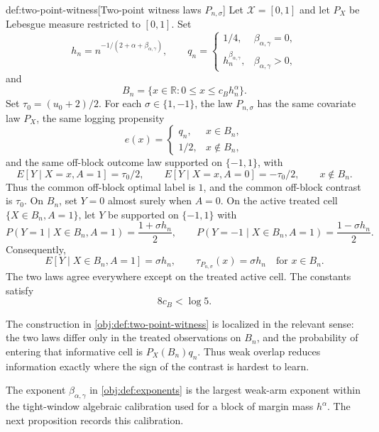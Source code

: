 \begin{definitionv}{def:two-point-witness}[Two-point witness laws \(P_{n,\sigma}\)]
Let \(\mathcal X=[0,1]\) and let \(P_X\) be Lebesgue measure restricted to \([0,1]\). Set
\[
h_n=n^{-1/(2+\alpha+\beta_{\alpha,\gamma})},
\qquad
q_n=
\begin{cases}
1/4, & \beta_{\alpha,\gamma}=0,\\
h_n^{\beta_{\alpha,\gamma}}, & \beta_{\alpha,\gamma}>0,
\end{cases}
\]
and
\[
B_n=\{x\in\mathbb R:0\le x\le c_Bh_n^\alpha\}.
\]
Set \(\tau_0=(u_0+2)/2\). For each \(\sigma\in\{1,-1\}\), the law \(P_{n,\sigma}\) has the same covariate law \(P_X\), the same logging propensity
\[
e(x)=
\begin{cases}
q_n, & x\in B_n,\\
1/2, & x\notin B_n,
\end{cases}
\]
and the same off-block outcome law supported on \(\{-1,1\}\), with
\[
E[Y\mid X=x,A=1]=\tau_0/2,
\qquad
E[Y\mid X=x,A=0]=-\tau_0/2,
\qquad x\notin B_n .
\]
Thus the common off-block optimal label is \(1\), and the common off-block contrast is \(\tau_0\). On \(B_n\), set \(Y=0\) almost surely when \(A=0\). On the active treated cell \(\{X\in B_n,A=1\}\), let \(Y\) be supported on \(\{-1,1\}\) with
\[
P(Y=1\mid X\in B_n,A=1)=\frac{1+\sigma h_n}{2},
\qquad
P(Y=-1\mid X\in B_n,A=1)=\frac{1-\sigma h_n}{2}.
\]
Consequently,
\[
E[Y\mid X\in B_n,A=1]=\sigma h_n,
\qquad
\tau_{P_{n,\sigma}}(x)=\sigma h_n
\quad\text{for }x\in B_n .
\]
The two laws agree everywhere except on the treated active cell. The constants satisfy
\[
8c_B<\log 5 .
\]
\end{definitionv}

The construction in \cref{obj:def:two-point-witness} is localized in the relevant sense: the two laws differ only in the treated observations on \(B_n\), and the probability of entering that informative cell is \(P_X(B_n)q_n\).  Thus weak overlap reduces information exactly where the sign of the contrast is hardest to learn.

The exponent \(\beta_{\alpha,\gamma}\) in \cref{obj:def:exponents} is the largest weak-arm exponent within the tight-window algebraic calibration used for a block of margin mass \(h^\alpha\).  The next proposition records this calibration.

